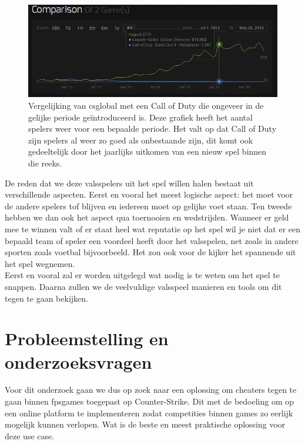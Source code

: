 \documentclass[pdftex,a4paper,12pt,twoside]{report}
\begin{document}
\begin{figure}[H]
\centering
\includegraphics[width=15cm]{img/csgovsbo3}
\caption{Vergelijking van \gls{csglobal} met een Call of Duty die ongeveer in de gelijke periode geïntroduceerd is. Deze grafiek heeft het aantal spelers weer voor een bepaalde periode. Het valt op dat Call of Duty zijn spelers al weer zo goed als onbestaande zijn, dit komt ook gedeeltelijk door het jaarlijks uitkomen van een nieuw spel binnen die reeks. \citep{steamcharts}}
\end{figure} 

De reden dat we deze valsspelers uit het spel willen halen bestaat uit verschillende aspecten. Eerst en vooral het meest logische aspect: het moet voor de andere spelers tof blijven en iedereen moet op gelijke voet staan. Ten tweede hebben we dan ook het aspect qua toernooien en wedstrijden. Wanneer er geld mee te winnen valt of er staat heel wat reputatie op het spel wil je niet dat er een bepaald team of speler een voordeel heeft door het valsspelen, net zoals in andere sporten zoals voetbal bijvoorbeeld. Het zou ook voor de kijker het spannende uit het spel wegnemen.
\\ 

Eerst en vooral zal er worden uitgelegd wat nodig is te weten om het spel te snappen. Daarna zullen we de veelvuldige valsspeel manieren en tools om dit tegen te gaan bekijken.


\section{Probleemstelling en onderzoeksvragen}
\label{sec:onderzoeksvragen}

Voor dit onderzoek gaan we dus op zoek naar een oplossing om \gls{cheat}ers tegen te gaan binnen \gls{fpsgames} toegepast op Counter-Strike. Dit met de bedoeling om op een online platform te implementeren zodat competities binnen games zo eerlijk mogelijk kunnen verlopen. Wat is de beste en meest praktische oplossing voor deze use case. 
\\
\end{document}
